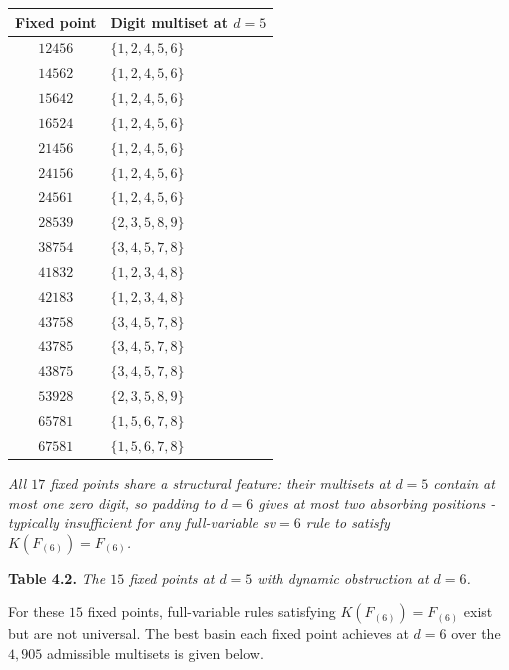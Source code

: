 \documentclass[11pt,letterpaper]{article}
\theoremstyle{paperstyle}
\theoremstyle{paperstyledef}
\theoremstyle{paperstylerem}
\begin{document}
\begin{longtable}[]{@{}cl@{}}
\toprule\noalign{}
Fixed point & Digit multiset at \(d = 5\) \\
\midrule\noalign{}
\endhead
\bottomrule\noalign{}
\endlastfoot
\(12456\) & \(\{1, 2, 4, 5, 6\}\) \\
\(14562\) & \(\{1, 2, 4, 5, 6\}\) \\
\(15642\) & \(\{1, 2, 4, 5, 6\}\) \\
\(16524\) & \(\{1, 2, 4, 5, 6\}\) \\
\(21456\) & \(\{1, 2, 4, 5, 6\}\) \\
\(24156\) & \(\{1, 2, 4, 5, 6\}\) \\
\(24561\) & \(\{1, 2, 4, 5, 6\}\) \\
\(28539\) & \(\{2, 3, 5, 8, 9\}\) \\
\(38754\) & \(\{3, 4, 5, 7, 8\}\) \\
\(41832\) & \(\{1, 2, 3, 4, 8\}\) \\
\(42183\) & \(\{1, 2, 3, 4, 8\}\) \\
\(43758\) & \(\{3, 4, 5, 7, 8\}\) \\
\(43785\) & \(\{3, 4, 5, 7, 8\}\) \\
\(43875\) & \(\{3, 4, 5, 7, 8\}\) \\
\(53928\) & \(\{2, 3, 5, 8, 9\}\) \\
\(65781\) & \(\{1, 5, 6, 7, 8\}\) \\
\(67581\) & \(\{1, 5, 6, 7, 8\}\) \\
\end{longtable}

\emph{All \(17\) fixed points share a structural feature: their
multisets at \(d = 5\) contain at most one zero digit, so padding to
\(d = 6\) gives at most two absorbing positions - typically
insufficient for any full-variable sv\(=6\) rule to satisfy
\(K(F_{(6)}) = F_{(6)}\).}

\textbf{Table 4.2.} \emph{The \(15\) fixed points at \(d = 5\) with
dynamic obstruction at \(d = 6\).}

For these \(15\) fixed points, full-variable rules satisfying
\(K(F_{(6)}) = F_{(6)}\) exist but are not universal. The best basin
each fixed point achieves at \(d = 6\) over the \(4{,}905\) admissible
multisets is given below.
\end{document}
